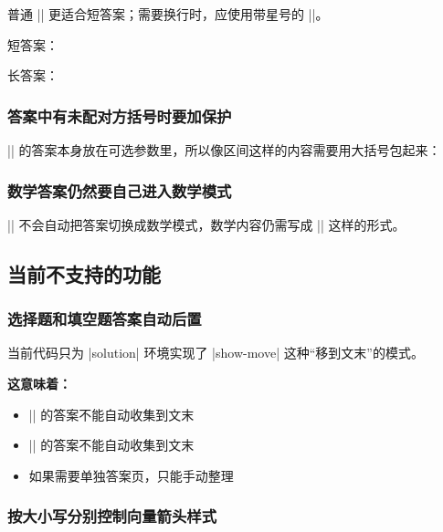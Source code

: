 普通 |\fillin| 更适合短答案；需要换行时，应使用带星号的 |\fillin*|。

\begin{latexcode}
  短答案：\fillin[42]

  长答案：
\end{latexcode}

\subsubsection{答案中有未配对方括号时要加保护}

|\fillin| 的答案本身放在可选参数里，所以像区间这样的内容需要用大括号包起来：

\begin{latexcode}
  \fillin[[2,3)]

  \fillin[{$[2,3)$}]
\end{latexcode}

\subsubsection{数学答案仍然要自己进入数学模式}

|\fillin| 不会自动把答案切换成数学模式，数学内容仍需写成 |\fillin[$x^2+1$]| 这样的形式。


\subsection{当前不支持的功能}

\subsubsection{选择题和填空题答案自动后置}

当前代码只为 |solution| 环境实现了 |show-move| 这种“移到文末”的模式。

\textbf{这意味着：}
\begin{itemize}
  \item |\paren| 的答案不能自动收集到文末
  \item |\fillin| 的答案不能自动收集到文末
  \item 如果需要单独答案页，只能手动整理
\end{itemize}

\subsubsection{按大小写分别控制向量箭头样式}

